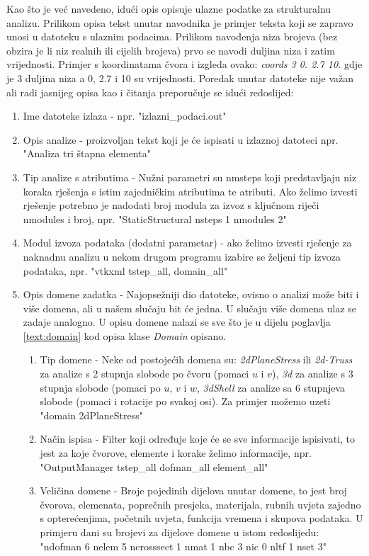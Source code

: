 \documentclass[a4paper,twoside,12pt]{memoir} %
\begin{document}
Kao što je već navedeno, idući opis opisuje ulazne podatke za strukturalnu analizu. Prilikom opisa tekst unutar navodnika je primjer teksta koji se zapravo unosi u datoteku s ulaznim podacima. Prilikom navođenja niza brojeva (bez obzira je li niz realnih ili cijelih brojeva) prvo se navodi duljina niza i zatim vrijednosti. Primjer s koordinatama čvora i izgleda ovako: \textit{coords 3 0.  2.7  10.} gdje je 3 duljina niza a 0, 2.7 i 10 su vrijednosti. Poredak unutar datoteke nije važan ali radi jasnijeg opisa kao i čitanja preporučuje se idući redoslijed:
\begin{enumerate}
    \item Ime datoteke izlaza - npr. "izlazni\_podaci.out"
    \item Opis analize - proizvoljan tekst koji je će ispisati u izlaznoj datoteci npr. "Analiza tri štapna elementa"
    \item Tip analize s atributima - Nužni parametri su nmsteps koji predstavljaju niz koraka rješenja s istim zajedničkim atributima te atributi. Ako želimo izvesti rješenje potrebno je nadodati broj modula za izvoz s ključnom riječi nmodules i broj, npr. "StaticStructural nsteps 1 nmodules 2"
    \item Modul izvoza podataka (dodatni parametar) - ako želimo izvesti rješenje za naknadnu analizu u nekom drugom programu izabire se željeni tip izvoza podataka, npr. "vtkxml tstep\_all, domain\_all"
    \item Opis domene zadatka - Najopsežniji dio datoteke, ovisno o analizi može biti i više domena, ali u našem slučaju bit će jedna. U slučaju više domena ulaz se zadaje analogno. U opisu domene nalazi se sve što je u dijelu poglavlja \ref{text:domain} kod opisa klase \textit{Domain} opisano.
    \begin{enumerate}
        \item Tip domene - Neke od postojećih domena su: \textit{2dPlaneStress} ili \textit{2d-Truss} za analize s 2 stupnja slobode po čvoru (pomaci $u$ i $v$), \textit{3d} za analize s 3 stupnja slobode (pomaci po $u$, $v$ i $w$, \textit{3dShell} za analize sa 6 stupnjeva slobode (pomaci i rotacije po svakoj osi). Za primjer možemo uzeti "domain 2dPlaneStress"
        \item Način ispisa - Filter koji određuje koje će se sve informacije ispisivati, to jest za koje čvorove, elemente i korake želimo informacije, npr. "OutputManager tstep\_all dofman\_all element\_all"
        \item Veličina domene - Broje pojedinih dijelova unutar domene, to jest broj čvorova, elemenata, poprečnih presjeka, materijala, rubnih uvjeta zajedno s opterećenjima, početnih uvjeta, funkcija vremena i skupova podataka. U primjeru dani su brojevi za dijelove domene u istom redoslijedu: "ndofman 6 nelem 5 ncrosssect 1 nmat 1 nbc 3 nic 0 nltf 1 nset 3"

\end{enumerate}
\end{enumerate}
\end{document}
